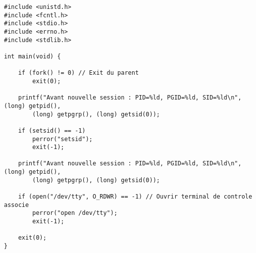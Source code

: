\begin{lstlisting}[caption={creationSession.c}, label={creationSession.c}]
#include <unistd.h>
#include <fcntl.h>
#include <stdio.h>
#include <errno.h>
#include <stdlib.h>  

int main(void) {

    if (fork() != 0) // Exit du parent
        exit(0);

    printf("Avant nouvelle session : PID=%ld, PGID=%ld, SID=%ld\n", (long) getpid(),
        (long) getpgrp(), (long) getsid(0));

    if (setsid() == -1)
        perror("setsid");
        exit(-1);

    printf("Avant nouvelle session : PID=%ld, PGID=%ld, SID=%ld\n", (long) getpid(),
        (long) getpgrp(), (long) getsid(0));

    if (open("/dev/tty", O_RDWR) == -1) // Ouvrir terminal de controle associe
        perror("open /dev/tty");
        exit(-1);

    exit(0);
}

\end{lstlisting}







